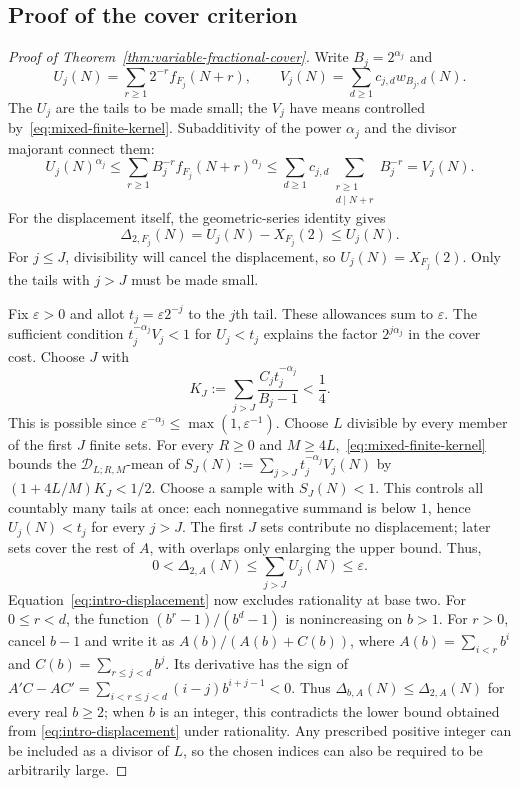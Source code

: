 \documentclass[11pt]{article}
\begin{document}
\subsection{Proof of the cover criterion}
\begin{proof}[Proof of Theorem~\ref{thm:variable-fractional-cover}]
Write $B_j=2^{\alpha_j}$ and
\[
 U_j(N)=\sum_{r\ge1}2^{-r}f_{F_j}(N+r),\qquad
 V_j(N)=\sum_{d\ge1}c_{j,d}w_{B_j,d}(N).
\]
The $U_j$ are the tails to be made small; the $V_j$ have means controlled
by~\eqref{eq:mixed-finite-kernel}. Subadditivity of the power $\alpha_j$
and the divisor majorant connect them:
\[
 U_j(N)^{\alpha_j}
 \le\sum_{r\ge1}B_j^{-r}f_{F_j}(N+r)^{\alpha_j}
 \le\sum_{d\ge1}c_{j,d}
       \sum_{\substack{r\ge1\\d\mid N+r}}B_j^{-r}
 =V_j(N).
\]
For the displacement itself, the geometric-series identity gives
\[
 \Delta_{2,F_j}(N)=U_j(N)-X_{F_j}(2)\le U_j(N).
\]
For $j\le J$, divisibility will cancel the displacement, so
$U_j(N)=X_{F_j}(2)$. Only the tails with $j>J$ must be made small.

Fix $\varepsilon>0$ and allot $t_j=\varepsilon2^{-j}$ to the $j$th
tail. These allowances sum to $\varepsilon$. The sufficient condition
$t_j^{-\alpha_j}V_j<1$ for $U_j<t_j$ explains the factor
$2^{j\alpha_j}$ in the cover cost. Choose $J$ with
\[
 K_J:=\sum_{j>J}\frac{C_jt_j^{-\alpha_j}}{B_j-1}<\frac14.
\]
This is possible since $\varepsilon^{-\alpha_j}\le\max(1,\varepsilon^{-1})$.
Choose $L$ divisible by every member of the first $J$ finite sets.
For every $R\ge0$ and $M\ge4L$,~\eqref{eq:mixed-finite-kernel}
bounds the $\mathscr D_{L;R,M}$-mean of
$S_J(N):=\sum_{j>J}t_j^{-\alpha_j}V_j(N)$ by
$(1+4L/M)K_J<1/2$. Choose a sample with $S_J(N)<1$.
This controls all countably many tails at once: each nonnegative
summand is below $1$, hence $U_j(N)<t_j$ for every $j>J$.
The first $J$ sets contribute no displacement; later sets cover the
rest of $A$, with overlaps only enlarging the upper bound. Thus,
\[
 0<\Delta_{2,A}(N)\le\sum_{j>J}U_j(N)\le\varepsilon.
\]
Equation~\eqref{eq:intro-displacement} now excludes rationality at base two.
For $0\le r<d$, the function $(b^r-1)/(b^d-1)$ is nonincreasing
on $b>1$.  For $r>0$, cancel $b-1$ and write it as
$A(b)/(A(b)+C(b))$, where $A(b)=\sum_{i<r}b^i$ and
$C(b)=\sum_{r\le j<d}b^j$.  Its derivative has the sign of
$A'C-AC'=\sum_{i<r\le j<d}(i-j)b^{i+j-1}<0$.
Thus $\Delta_{b,A}(N)\le\Delta_{2,A}(N)$ for every real $b\ge2$;
when $b$ is an integer, this contradicts the lower bound obtained from
\eqref{eq:intro-displacement} under rationality. Any prescribed positive
integer can be included as a divisor of $L$, so the chosen indices
can also be required to be arbitrarily large.
\end{proof}
\end{document}
